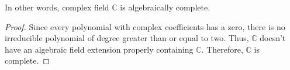 \begin{important}
	In other words, complex field $\mathbb{C}$ is algebraically complete.
\end{important}
\begin{proof}
	Since every polynomial with complex coefficients has a zero, there is no irreducible polynomial of degree greater than or equal to two.
	Thus, $\mathbb{C}$ doesn't have an algebraic field extension properly containing $\mathbb{C}$.
	Therefore, $\mathbb{C}$ is complete.
\end{proof}


